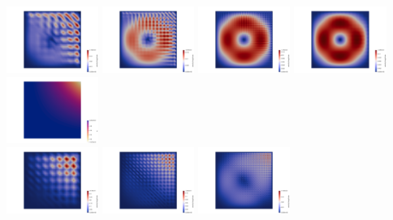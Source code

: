 \begin{center}
\includegraphics[width=3cm]{python_codes/fieldstone_107/results/mms/q2q1/vel08}
\includegraphics[width=3cm]{python_codes/fieldstone_107/results/mms/q2q1/vel16}
\includegraphics[width=3cm]{python_codes/fieldstone_107/results/mms/q2q1/vel32}
\includegraphics[width=3cm]{python_codes/fieldstone_107/results/mms/q2q1/vel64}
\includegraphics[width=3cm]{python_codes/fieldstone_107/results/mms/q2q1/q64}\\
\includegraphics[width=3cm]{python_codes/fieldstone_107/results/mms/q2p1/vel08}
\includegraphics[width=3cm]{python_codes/fieldstone_107/results/mms/q2p1/vel16}
\includegraphics[width=3cm]{python_codes/fieldstone_107/results/mms/q2p1/vel32}

\end{center}
